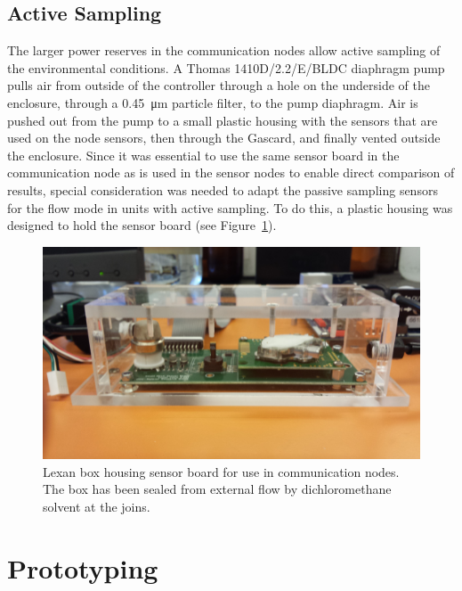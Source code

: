 \documentclass[journal]{IEEEtran}
\begin{document}
\subsection{Active Sampling}
\label{sec:activesampling}
The larger power reserves in the communication nodes allow active sampling of the environmental conditions.  A Thomas 1410D/2.2/E/BLDC diaphragm pump pulls air from outside of the controller through a hole on the underside of the enclosure, through a \SI{0.45}{\micro\meter} particle filter, to the pump diaphragm.  Air is pushed out from the pump to a small plastic housing with the sensors that are used on the node sensors, then through the Gascard, and finally vented outside the enclosure.  Since it was essential to use the same sensor board in the communication node as is used in the sensor nodes to enable direct comparison of results, special consideration was needed to adapt the passive sampling sensors for the flow mode in units with active sampling.  To do this, a plastic housing was designed to hold the sensor board (see Figure~\ref{fig:lexbox}).  

\begin{figure}[!t]
	\centering
	\includegraphics[width=.8\columnwidth,height=0.8\columnwidth,keepaspectratio]{lexbox.jpg}
	\caption[Lexan box housing]{Lexan box housing sensor board for use in communication nodes.  The box has been sealed from external flow by dichloromethane solvent at the joins.}
	\label{fig:lexbox}
\end{figure}

\section{Prototyping}
\end{document}
